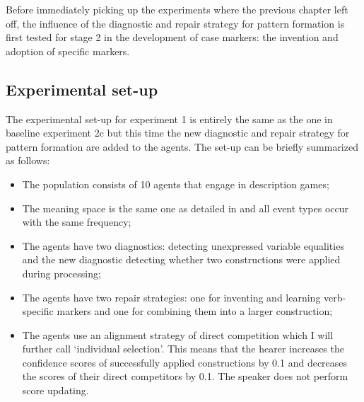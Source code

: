 Before immediately picking up the experiments where the previous chapter left off, the influence of the diagnostic and repair strategy for pattern formation is first tested for stage 2 in the development of case markers: the invention and adoption of specific markers.

\subsection{Experimental set-up}

The experimental set-up for experiment 1 is entirely the same as the one in baseline experiment 2c but this time the new diagnostic and repair strategy for pattern formation are added to the agents. The set-up can be briefly summarized as follows:

\begin{itemize}
\item The population consists of 10 agents that engage in description games;
\item The meaning space is the same one as detailed in  and all event types occur with the same frequency;
\item The agents have two diagnostics: detecting unexpressed variable equalities and the new diagnostic detecting whether two constructions were applied during processing;
\item The agents have two repair strategies: one for inventing and learning verb-specific markers and one for combining them into a larger construction;
\item The agents use an alignment strategy of direct competition which I will further call `individual selection'. This means that the hearer increases the confidence scores of successfully applied constructions by 0.1 and decreases the scores of their direct competitors by 0.1. The speaker does not perform score updating.
\end{itemize}

